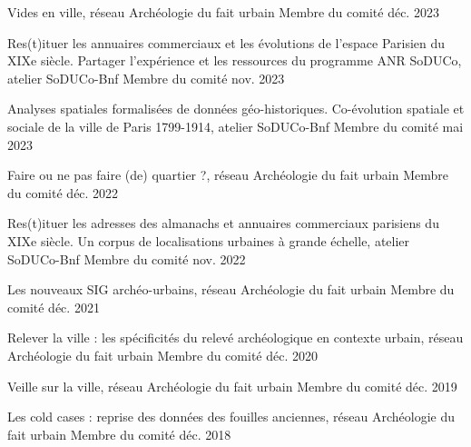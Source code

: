 
\begin{cvhonors}
  \cvhonor
    {Vides en ville, réseau Archéologie du fait urbain} %
    {Membre du comité} %
    {} %
    {déc. 2023} %

  \cvhonor
    {Res(t)ituer les annuaires commerciaux et les évolutions de l’espace Parisien du XIXe siècle. Partager l’expérience et les ressources du programme ANR SoDUCo, atelier SoDUCo-Bnf} %
    {Membre du comité} %
    {} %
    {nov. 2023} %

  \cvhonor
    {Analyses spatiales formalisées de données géo-historiques. Co-évolution spatiale et sociale de la ville de Paris 1799-1914, atelier SoDUCo-Bnf} %
    {Membre du comité} %
    {} %
    {mai 2023} %

  \cvhonor
    {Faire ou ne pas faire (de) quartier ?, réseau Archéologie du fait urbain} %
    {Membre du comité} %
    {} %
    {déc. 2022} %

  \cvhonor
    {Res(t)ituer les adresses des almanachs et annuaires commerciaux parisiens du XIXe siècle. Un corpus de localisations urbaines à grande échelle, atelier SoDUCo-Bnf} %
    {Membre du comité} %
    {} %
    {nov. 2022} %

  \cvhonor
    {Les nouveaux SIG archéo-urbains, réseau Archéologie du fait urbain} %
    {Membre du comité} %
    {} %
    {déc. 2021} %

  \cvhonor
    {Relever la ville : les spécificités du relevé archéologique en contexte urbain, réseau Archéologie du fait urbain} %
    {Membre du comité} %
    {} %
    {déc. 2020} %
    
  \cvhonor
    {Veille sur la ville, réseau Archéologie du fait urbain} %
    {Membre du comité} %
    {} %
    {déc. 2019} %
    
  \cvhonor
    {Les cold cases : reprise des données des fouilles anciennes, réseau Archéologie du fait urbain} %
    {Membre du comité} %
    {} %
    {déc. 2018} %

\end{cvhonors}

